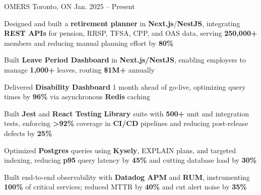 \documentclass[11pt, a4paper]{awesome-cv}
\begin{document}
\makecvheader[C]


\begin{cventries}


  \cventry
    {\color{lightblue}{ASSOCIATE FULL-STACK ENGINEER}}
    {OMERS}
    {Toronto, ON}
    {Jan. 2025 -- Present}
    {
      \begin{cvitems}
        \item{Designed and built a \textbf{retirement planner} in \textbf{Next.js}/\textbf{NestJS}, integrating \textbf{REST APIs} for pension, RRSP, TFSA, CPP, and OAS data, serving \textbf{250,000+} members and reducing manual planning effort by \textbf{80\%}}
        \item{Built \textbf{Leave Period Dashboard} in \textbf{Next.js/NestJS}, enabling employers to manage \textbf{1,000+} leaves, routing \textbf{\$1M+} annually}
        \item{Delivered \textbf{Disability Dashboard} 1 month ahead of go-live, optimizing query times by \textbf{96\%} via asynchronous \textbf{Redis} caching}
        \item{Built \textbf{Jest} and \textbf{React Testing Library} suite with \textbf{500+} unit and integration tests, enforcing \textbf{>92\%} coverage in \textbf{CI/CD} pipelines and reducing post-release defects by \textbf{25\%}}
        \item{Optimized \textbf{Postgres} queries using \textbf{Kysely}, EXPLAIN plans, and targeted indexing, reducing \textbf{p95} query latency by \textbf{45\%} and cutting database load by \textbf{30\%}}
        \item{Built end-to-end observability with \textbf{Datadog APM} and \textbf{RUM}, instrumenting \textbf{100\%} of critical services; reduced MTTR by \textbf{40\%} and cut alert noise by \textbf{35\%}}
      \end{cvitems}
    }

  \vspace{3mm}


\end{cventries}
\end{document}
